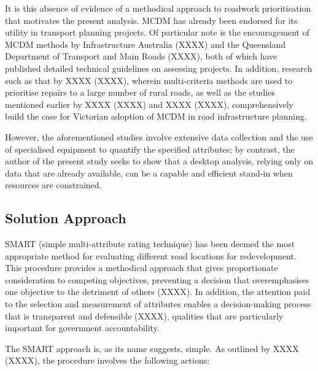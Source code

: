 \documentclass[11pt, a4paper]{article}
\begin{document}
    It is this absence of evidence of a methodical approach to roadwork prioritisation that motivates the present analysis. MCDM has already been endorsed for its utility in transport planning projects. Of particular note is the encouragement of MCDM methods by Infrastructure Australia (XXXX) and the Queensland Department of Transport and Main Roads (XXXX), both of which have published detailed technical guidelines on assessing projects. In addition, research such as that by XXXX (XXXX), wherein multi-criteria methods are used to prioritise repairs to a large number of rural roads, as well as the studies mentioned earlier by XXXX (XXXX) and XXXX (XXXX), comprehensively build the case for Victorian adoption of MCDM in road infrastructure planning.
    
    However, the aforementioned studies involve extensive data collection and the use of specialised equipment to quantify the specified attributes; by contrast, the author of the present study seeks to show that a desktop analysis, relying only on data that are already available, can be a capable and efficient stand-in when resources are constrained.
    
    \subsection{Solution Approach}

    SMART (simple multi-attribute rating technique) has been deemed the most appropriate method for evaluating different road locations for redevelopment. This procedure provides a methodical approach that gives proportionate consideration to competing objectives, preventing a decision that overemphasises one objective to the detriment of others (XXXX). In addition, the attention paid to the selection and measurement of attributes enables a decision-making process that is transparent and defensible (XXXX), qualities that are particularly important for government accountability.

    The SMART approach is, as its name suggests, simple. As outlined by XXXX (XXXX), the procedure involves the following actions:
\end{document}
